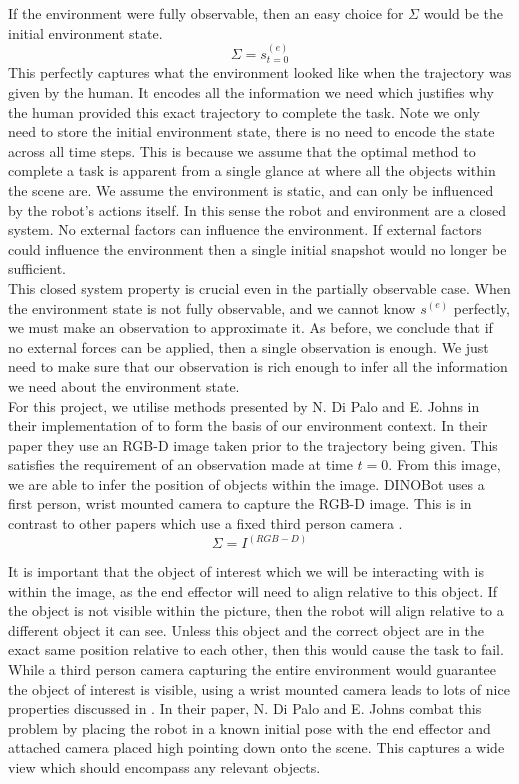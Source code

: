 If the environment were fully observable, then an easy choice for $\Sigma$ would be the initial environment state.
$$\Sigma = s^{(e)}_{t=0}$$
This perfectly captures what the environment looked like when the trajectory was given by the human. It encodes all the information we need which justifies why the human provided this exact trajectory to complete the task. Note we only need to store the initial environment state, there is no need to encode the state across all time steps. This is because we assume that the optimal method to complete a task is apparent from a single glance at where all the objects within the scene are. We assume the environment is static, and can only be influenced by the robot's actions itself. In this sense the robot and environment are a closed system. No external factors can influence the environment. If external factors could influence the environment then a single initial snapshot would no longer be sufficient.\\

This closed system property is crucial even in the partially observable case. When the environment state is not fully observable, and we cannot know $s^{(e)}$ perfectly, we must make an observation to approximate it. As before, we conclude that if no external forces can be applied, then a single observation is enough. We just need to make sure that our observation is rich enough to infer all the information we need about the environment state.\\

For this project, we utilise methods presented by N. Di Palo and E. Johns in their implementation of  \cite{one-shot-imitation} to form the basis of our environment context. In their paper they use an RGB-D image taken prior to the trajectory being given. This satisfies the requirement of an observation made at time $t=0$. From this image, we are able to infer the position of objects within the image. DINOBot uses a first person, wrist mounted camera to capture the RGB-D image. This is in contrast to other papers which use a fixed third person camera \cite{one-shot-pose-estimate}.
$$\Sigma = I^{(RGB-D)}$$

It is important that the object of interest which we will be interacting with is within the image, as the end effector will need to align relative to this object. If the object is not visible within the picture, then the robot will align relative to a different object it can see. Unless this object and the correct object are in the exact same position relative to each other, then this would cause the task to fail. While a third person camera capturing the entire environment would guarantee the object of interest is visible, using a wrist mounted camera leads to lots of nice properties discussed in . In their paper, N. Di Palo and E. Johns combat this problem by placing the robot in a known initial pose with the end effector and attached camera placed high pointing down onto the scene. This captures a wide view which should encompass any relevant objects.\\

